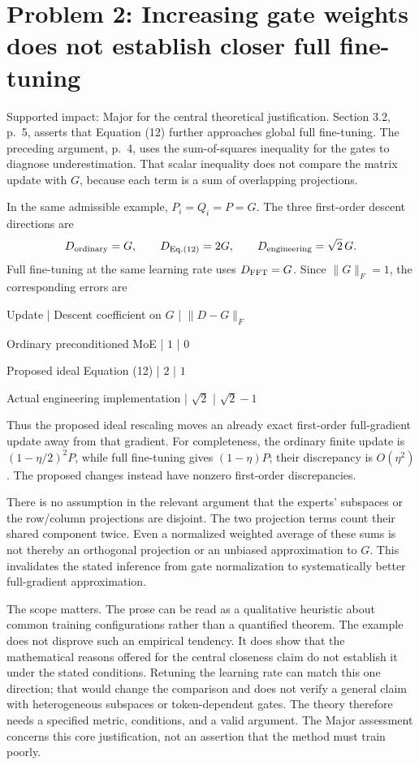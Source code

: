 \documentclass[10pt]{article}
\begin{document}
\section*{Problem 2: Increasing gate weights does not establish closer full fine-tuning}
Supported impact: Major for the central theoretical justification. Section 3.2, p. 5, asserts that Equation (12) further approaches global full fine-tuning. The preceding argument, p. 4, uses the sum-of-squares inequality for the gates to diagnose underestimation. That scalar inequality does not compare the matrix update with \(G\), because each term is a sum of overlapping projections.\par
In the same admissible example, \(P_i=Q_i=P=G\). The three first-order descent directions are \[D_{\rm ordinary}=G,\qquad
 D_{\rm Eq.(12)}=2G,\qquad
 D_{\rm engineering}=\sqrt2\,G .\] Full fine-tuning at the same learning rate uses \(D_{\rm FFT}=G\). Since \(\|G\|_F=1\), the corresponding errors are\par
Update | Descent coefficient on \(G\) | \(\|D-G\|_F\)\par
Ordinary preconditioned MoE | \(1\) | \(0\)\par
Proposed ideal Equation (12) | \(2\) | \(1\)\par
Actual engineering implementation | \(\sqrt2\) | \(\sqrt2-1\)\par
Thus the proposed ideal rescaling moves an already exact first-order full-gradient update away from that gradient. For completeness, the ordinary finite update is \((1-\eta/2)^2P\), while full fine-tuning gives \((1-\eta)P\); their discrepancy is \(O(\eta^2)\). The proposed changes instead have nonzero first-order discrepancies.\par
There is no assumption in the relevant argument that the experts’ subspaces or the row/column projections are disjoint. The two projection terms count their shared component twice. Even a normalized weighted average of these sums is not thereby an orthogonal projection or an unbiased approximation to \(G\). This invalidates the stated inference from gate normalization to systematically better full-gradient approximation.\par
The scope matters. The prose can be read as a qualitative heuristic about common training configurations rather than a quantified theorem. The example does not disprove such an empirical tendency. It does show that the mathematical reasons offered for the central closeness claim do not establish it under the stated conditions. Retuning the learning rate can match this one direction; that would change the comparison and does not verify a general claim with heterogeneous subspaces or token-dependent gates. The theory therefore needs a specified metric, conditions, and a valid argument. The Major assessment concerns this core justification, not an assertion that the method must train poorly.\par
\end{document}
